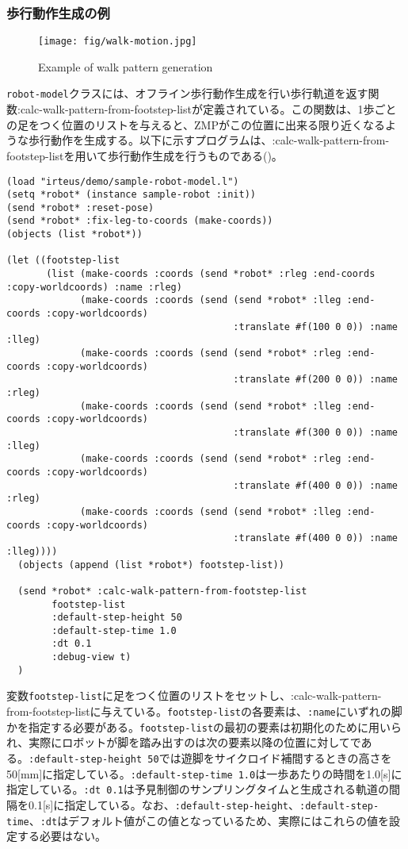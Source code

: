 \subsubsection{歩行動作生成の例}
\begin{figure}[htb]
  \begin{center}
    \texttt{[image: fig/walk-motion.jpg]}
    \caption{Example of walk pattern generation}
  \end{center}
\end{figure}

\verb|robot-model|クラスには、オフライン歩行動作生成を行い歩行軌道を返す関数:calc-walk-pattern-from-footstep-listが定義されている。この関数は、1歩ごとの足をつく位置のリストを与えると、ZMPがこの位置に出来る限り近くなるような歩行動作を生成する。以下に示すプログラムは、:calc-walk-pattern-from-footstep-listを用いて歩行動作生成を行うものである()。

{\baselineskip=10pt
\begin{verbatim}
(load "irteus/demo/sample-robot-model.l")
(setq *robot* (instance sample-robot :init))
(send *robot* :reset-pose)
(send *robot* :fix-leg-to-coords (make-coords))
(objects (list *robot*))

(let ((footstep-list
       (list (make-coords :coords (send *robot* :rleg :end-coords :copy-worldcoords) :name :rleg)
             (make-coords :coords (send (send *robot* :lleg :end-coords :copy-worldcoords)
                                        :translate #f(100 0 0)) :name :lleg)
             (make-coords :coords (send (send *robot* :rleg :end-coords :copy-worldcoords)
                                        :translate #f(200 0 0)) :name :rleg)
             (make-coords :coords (send (send *robot* :lleg :end-coords :copy-worldcoords)
                                        :translate #f(300 0 0)) :name :lleg)
             (make-coords :coords (send (send *robot* :rleg :end-coords :copy-worldcoords)
                                        :translate #f(400 0 0)) :name :rleg)
             (make-coords :coords (send (send *robot* :lleg :end-coords :copy-worldcoords)
                                        :translate #f(400 0 0)) :name :lleg))))
  (objects (append (list *robot*) footstep-list))

  (send *robot* :calc-walk-pattern-from-footstep-list
        footstep-list
        :default-step-height 50
        :default-step-time 1.0
        :dt 0.1
        :debug-view t)
  )
\end{verbatim}
}
変数\verb|footstep-list|に足をつく位置のリストをセットし、:calc-walk-pattern-from-footstep-listに与えている。\verb|footstep-list|の各要素は、\verb|:name|にいずれの脚かを指定する必要がある。\verb|footstep-list|の最初の要素は初期化のために用いられ、実際にロボットが脚を踏み出すのは次の要素以降の位置に対してである。\verb|:default-step-height 50|では遊脚をサイクロイド補間するときの高さを50[mm]に指定している。\verb|:default-step-time 1.0|は一歩あたりの時間を1.0[s]に指定している。\verb|:dt 0.1|は予見制御のサンプリングタイムと生成される軌道の間隔を0.1[s]に指定している。なお、\verb|:default-step-height|、\verb|:default-step-time|、\verb|:dt|はデフォルト値がこの値となっているため、実際にはこれらの値を設定する必要はない。


